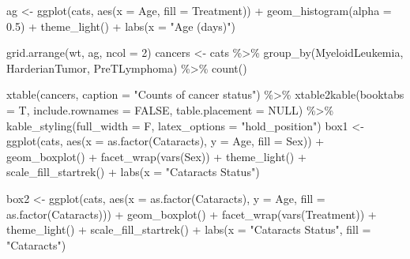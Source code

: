 \documentclass[12pt]{article}
\newenvironment{Shaded}{\begin{snugshade}}{\end{snugshade}}
\newcommand{\AttributeTok}[1]{\textcolor[rgb]{0.77,0.63,0.00}{#1}}
\newcommand{\ConstantTok}[1]{\textcolor[rgb]{0.00,0.00,0.00}{#1}}
\newcommand{\DecValTok}[1]{\textcolor[rgb]{0.00,0.00,0.81}{#1}}
\newcommand{\FloatTok}[1]{\textcolor[rgb]{0.00,0.00,0.81}{#1}}
\newcommand{\FunctionTok}[1]{\textcolor[rgb]{0.00,0.00,0.00}{#1}}
\newcommand{\NormalTok}[1]{#1}
\newcommand{\OtherTok}[1]{\textcolor[rgb]{0.56,0.35,0.01}{#1}}
\newcommand{\SpecialCharTok}[1]{\textcolor[rgb]{0.00,0.00,0.00}{#1}}
\newcommand{\StringTok}[1]{\textcolor[rgb]{0.31,0.60,0.02}{#1}}
\begin{document}
\begin{Shaded}
\begin{Highlighting}[]
\NormalTok{ag }\OtherTok{\textless{}{-}} \FunctionTok{ggplot}\NormalTok{(cats, }\FunctionTok{aes}\NormalTok{(}\AttributeTok{x =}\NormalTok{ Age, }\AttributeTok{fill =}\NormalTok{ Treatment)) }\SpecialCharTok{+} 
  \FunctionTok{geom\_histogram}\NormalTok{(}\AttributeTok{alpha =} \FloatTok{0.5}\NormalTok{) }\SpecialCharTok{+} 
  \FunctionTok{theme\_light}\NormalTok{() }\SpecialCharTok{+} 
  \FunctionTok{labs}\NormalTok{(}\AttributeTok{x =} \StringTok{"Age (days)"}\NormalTok{)}

\FunctionTok{grid.arrange}\NormalTok{(wt, ag, }\AttributeTok{ncol =} \DecValTok{2}\NormalTok{)}
\NormalTok{cancers }\OtherTok{\textless{}{-}}\NormalTok{ cats }\SpecialCharTok{\%\textgreater{}\%} 
  \FunctionTok{group\_by}\NormalTok{(MyeloidLeukemia, HarderianTumor, PreTLymphoma) }\SpecialCharTok{\%\textgreater{}\%}
  \FunctionTok{count}\NormalTok{()}

\FunctionTok{xtable}\NormalTok{(cancers, }\AttributeTok{caption =} \StringTok{"Counts of cancer status"}\NormalTok{) }\SpecialCharTok{\%\textgreater{}\%}
  \FunctionTok{xtable2kable}\NormalTok{(}\AttributeTok{booktabs =}\NormalTok{ T, }\AttributeTok{include.rownames =} \ConstantTok{FALSE}\NormalTok{, }\AttributeTok{table.placement =} \ConstantTok{NULL}\NormalTok{) }\SpecialCharTok{\%\textgreater{}\%}
  \FunctionTok{kable\_styling}\NormalTok{(}\AttributeTok{full\_width =}\NormalTok{ F, }\AttributeTok{latex\_options =} \StringTok{"hold\_position"}\NormalTok{) }
\NormalTok{box1 }\OtherTok{\textless{}{-}} \FunctionTok{ggplot}\NormalTok{(cats, }\FunctionTok{aes}\NormalTok{(}\AttributeTok{x =} \FunctionTok{as.factor}\NormalTok{(Cataracts), }\AttributeTok{y =}\NormalTok{ Age, }\AttributeTok{fill =}\NormalTok{ Sex)) }\SpecialCharTok{+} 
  \FunctionTok{geom\_boxplot}\NormalTok{() }\SpecialCharTok{+} \FunctionTok{facet\_wrap}\NormalTok{(}\FunctionTok{vars}\NormalTok{(Sex)) }\SpecialCharTok{+} 
  \FunctionTok{theme\_light}\NormalTok{() }\SpecialCharTok{+} \FunctionTok{scale\_fill\_startrek}\NormalTok{() }\SpecialCharTok{+} 
  \FunctionTok{labs}\NormalTok{(}\AttributeTok{x =} \StringTok{"Cataracts Status"}\NormalTok{)}

\NormalTok{box2 }\OtherTok{\textless{}{-}} \FunctionTok{ggplot}\NormalTok{(cats, }\FunctionTok{aes}\NormalTok{(}\AttributeTok{x =} \FunctionTok{as.factor}\NormalTok{(Cataracts), }\AttributeTok{y =}\NormalTok{ Age, }\AttributeTok{fill =} \FunctionTok{as.factor}\NormalTok{(Cataracts))) }\SpecialCharTok{+} 
  \FunctionTok{geom\_boxplot}\NormalTok{() }\SpecialCharTok{+} \FunctionTok{facet\_wrap}\NormalTok{(}\FunctionTok{vars}\NormalTok{(Treatment)) }\SpecialCharTok{+}
  \FunctionTok{theme\_light}\NormalTok{() }\SpecialCharTok{+} \FunctionTok{scale\_fill\_startrek}\NormalTok{() }\SpecialCharTok{+} 
  \FunctionTok{labs}\NormalTok{(}\AttributeTok{x =} \StringTok{"Cataracts Status"}\NormalTok{, }\AttributeTok{fill =} \StringTok{"Cataracts"}\NormalTok{)}


\end{Highlighting}
\end{Shaded}
\end{document}
